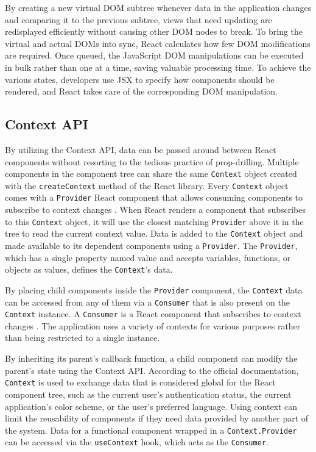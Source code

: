 By creating a new virtual DOM subtree whenever data in the application changes and comparing it to the previous subtree, views that need updating are redisplayed efficiently without causing other DOM nodes to break. To bring the virtual and actual DOMs into sync, React calculates how few DOM modifications are required. Once queued, the JavaScript DOM manipulations can be executed in bulk rather than one at a time, saving valuable processing time. To achieve the various states, developers use JSX to specify how components should be rendered, and React takes care of the corresponding DOM manipulation.

\subsection{Context API}
\label{contextApi}
By utilizing the Context API, data can be passed around between React components without resorting to the tedious practice of prop-drilling. Multiple components in the component tree can share the same \texttt{Context} object created with the \texttt{createContext} method of the React library. Every \texttt{Context} object comes with a \texttt{Provider} React component that allows consuming components to subscribe to context changes \autocite{react2021context}. When React renders a component that subscribes to this \texttt{Context} object, it will use the closest matching \texttt{Provider} above it in the tree to read the current context value. Data is added to the \texttt{Context} object and made available to its dependent components using a \texttt{Provider}. The \texttt{Provider}, which has a single property named value and accepts variables, functions, or objects as values, defines the \texttt{Context}'s data.

By placing child components inside the \texttt{Provider} component, the \texttt{Context} data can be accessed from any of them via a \texttt{Consumer} that is also present on the \texttt{Context} instance. A \texttt{Consumer} is a React component that subscribes to context changes \autocite{react2021context}. The application uses a variety of contexts for various purposes rather than being restricted to a single instance.

By inheriting its parent's callback function, a child component can modify the parent's state using the Context API. According to the official documentation, \texttt{Context} is used to exchange data that is considered global for the React component tree, such as the current user's authentication status, the current application's color scheme, or the user's preferred language. Using context can limit the reusability of components if they need data provided by another part of the system. Data for a functional component wrapped in a \texttt{Context.Provider} can be accessed via the \texttt{useContext} hook, which acts as the \texttt{Consumer}.

